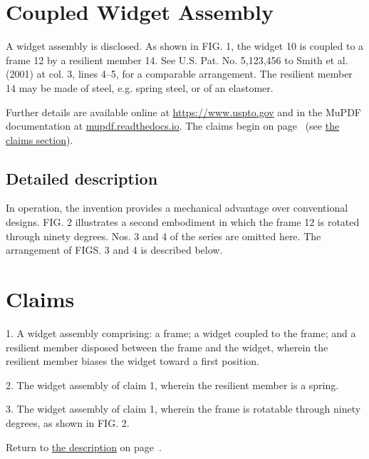 \documentclass[10pt,twocolumn]{article}
\begin{document}
\section*{Coupled Widget Assembly}
\label{sec:top}
A widget assembly is disclosed. As shown in FIG. 1, the widget 10 is coupled to a frame 12 by a resilient member 14. See U.S. Pat. No. 5,123,456 to Smith et al. (2001) at col. 3, lines 4--5, for a comparable arrangement. The resilient member 14 may be made of steel, e.g. spring steel, or of an elastomer.

Further details are available online at \url{https://www.uspto.gov} and in the MuPDF documentation at \href{https://mupdf.readthedocs.io/en/latest/}{mupdf.readthedocs.io}. The claims begin on page~\pageref{sec:claims} (see \hyperref[sec:claims]{the claims section}).

\subsection*{Detailed description}
In operation, the invention provides a mechanical advantage over conventional designs. FIG. 2 illustrates a second embodiment in which the frame 12 is rotated through ninety degrees. Nos. 3 and 4 of the series are omitted here. The arrangement of FIGS. 3 and 4 is described below.

\lipsum[1-6]

\newpage
\section*{Claims}
\label{sec:claims}
1. A widget assembly comprising: a frame; a widget coupled to the frame; and a resilient member disposed between the frame and the widget, wherein the resilient member biases the widget toward a first position.

2. The widget assembly of claim 1, wherein the resilient member is a spring.

3. The widget assembly of claim 1, wherein the frame is rotatable through ninety degrees, as shown in FIG. 2.

Return to \hyperref[sec:top]{the description} on page~\pageref{sec:top}.

\lipsum[7-9]
\end{document}
